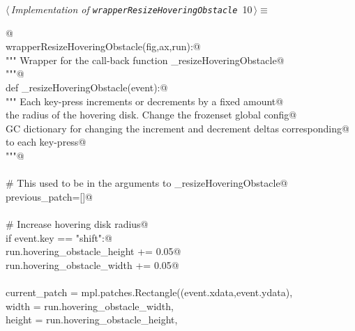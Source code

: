 \documentclass[11.5pt]{report}
\begin{document}
\begin{flushleft} \small\label{scrap10}\raggedright\small
{} $\langle\,${\itshape Implementation of \verb|wrapperResizeHoveringObstacle|}\nobreak\ {\footnotesize {10}}$\,\rangle\equiv$
\vspace{-1ex}
\begin{list}{}{} \item
\mbox{}\verb@   @\\
\mbox{}\verb@def wrapperResizeHoveringObstacle(fig,ax,run):@\\
\mbox{}\verb@        """ Wrapper for the call-back function _resizeHoveringObstacle@\\
\mbox{}\verb@        """@\\
\mbox{}\verb@        def _resizeHoveringObstacle(event):@\\
\mbox{}\verb@            """ Each key-press increments or decrements by a fixed amount@\\
\mbox{}\verb@            the radius of the hovering disk. Change the frozenset global config@\\
\mbox{}\verb@            GC dictionary for changing the increment and decrement deltas corresponding@\\
\mbox{}\verb@            to each key-press@\\
\mbox{}\verb@            """@\\
\mbox{}\verb@@\\
\mbox{}\verb@            # This used to be in the arguments to _resizeHoveringObstacle@\\
\mbox{}\verb@            previous_patch=[]@\\
\mbox{}\verb@@\\
\mbox{}\verb@            # Increase hovering disk radius@\\
\mbox{}\verb@            if  event.key  == "shift":@\\
\mbox{}\verb@                run.hovering_obstacle_height += 0.05@\\
\mbox{}\verb@                run.hovering_obstacle_width += 0.05@\\
\mbox{}\verb@@\\
\mbox{}\verb@                current_patch = mpl.patches.Rectangle((event.xdata,event.ydata),         \@\\
\mbox{}\verb@                                                   width     = run.hovering_obstacle_width,  \@\\
\mbox{}\verb@                                                   height    = run.hovering_obstacle_height, \@\\

\end{list}
\end{flushleft}
\end{document}
